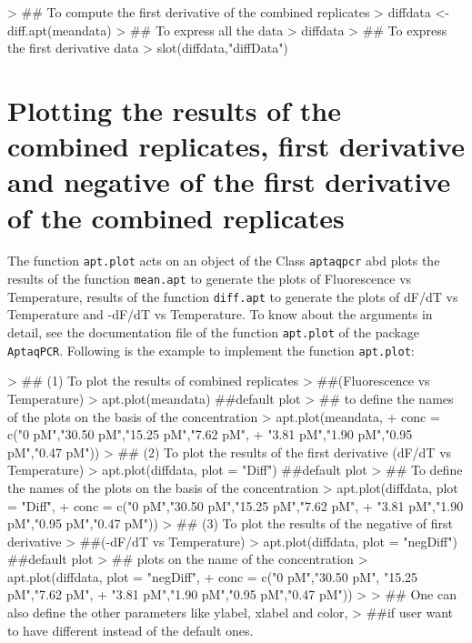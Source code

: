 \documentclass[11pt]{article}
\newcommand{\code}[1]{{\tt #1}}
\begin{document}
\begin{Schunk}
\begin{Sinput}
> ## To compute the first derivative of the combined replicates
> diffdata <- diff.apt(meandata)
> ## To express all the data
> diffdata
> ## To express the first derivative data
> slot(diffdata,"diffData")
\end{Sinput}
\end{Schunk}

\section{Plotting the results of the combined replicates, first derivative and negative of the first derivative of the combined replicates}
The function \code{apt.plot} acts on an object of the Class \code{aptaqpcr} abd plots the results of the function \code{mean.apt} to generate the plots of Fluorescence vs Temperature, results of the function \code{diff.apt} to generate the plots of dF/dT vs Temperature and -dF/dT vs Temperature. To know about the arguments in detail, see the documentation file of the function \code{apt.plot} of the package \code{AptaqPCR}. Following is the example to implement the function \code{apt.plot}:

\begin{Schunk}
\begin{Sinput}
> ## (1) To plot the results of combined replicates
> ##(Fluorescence vs Temperature)
> apt.plot(meandata) ##default plot
> ## to define the names of the plots on the basis of the concentration
> apt.plot(meandata,
+          conc = c("0 pM","30.50 pM","15.25 pM","7.62 pM",
+                   "3.81 pM","1.90 pM","0.95 pM","0.47 pM"))
> ## (2) To plot the results of the first derivative (dF/dT vs Temperature)
> apt.plot(diffdata, plot = "Diff") ##default plot
> ## To define the names of the plots on the basis of the concentration
> apt.plot(diffdata, plot = "Diff",
+          conc = c("0 pM","30.50 pM","15.25 pM","7.62 pM",
+                   "3.81 pM","1.90 pM","0.95 pM","0.47 pM"))
> ## (3) To plot the results of the negative of first derivative
> ##(-dF/dT vs Temperature)
> apt.plot(diffdata, plot = "negDiff") ##default plot
> ## plots on the name of the concentration
> apt.plot(diffdata, plot = "negDiff",
+          conc = c("0 pM","30.50 pM", "15.25 pM","7.62 pM",
+                   "3.81 pM","1.90 pM","0.95 pM","0.47 pM"))
> 
> ## One can also define the other parameters like ylabel, xlabel and color,
> ##if user want to have different instead of the default ones.
\end{Sinput}
\end{Schunk}
\end{document}
